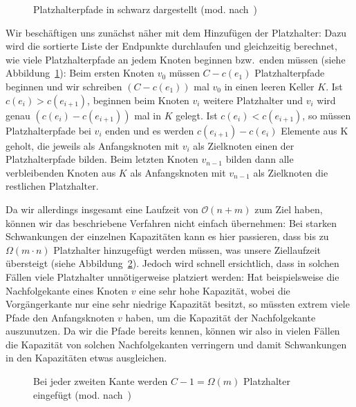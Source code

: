 \begin{figure}[htbp]
	\centering
	\def\svgwidth{250bp}
	
	\caption{Platzhalterpfade in schwarz dargestellt (mod. nach~\cite{paper})}
	\label{fig:dummy-paths}
\end{figure}

Wir beschäftigen uns zunächst näher mit dem Hinzufügen der Platzhalter:
Dazu wird die sortierte Liste der Endpunkte durchlaufen und gleichzeitig berechnet, wie viele Platzhalterpfade an jedem Knoten
beginnen bzw.\ enden müssen (siehe Abbildung~\ref{fig:dummy-paths}):
Beim ersten Knoten $v_0$ müssen $C - c(e_1)$ Platzhalterpfade beginnen und wir schreiben $(C - c(e_1))$ mal $v_0$ in einen
leeren Keller $K$.
Ist $c(e_i) > c(e_{i+1})$, beginnen beim Knoten $v_{i}$ weitere Platzhalter und $v_i$ wird genau $(c(e_i) - c(e_{i+1}))$ mal in $K$ gelegt.
Ist $c(e_i) < c(e_{i+1})$, so müssen Platzhalterpfade bei $v_i$ enden und es werden $c(e_{i+1}) - c(e_i)$ Elemente aus K geholt, die jeweils als Anfangsknoten mit $v_i$
als Zielknoten einen der Platzhalterpfade bilden.
Beim letzten Knoten $v_{n-1}$ bilden dann alle verbleibenden Knoten aus $K$ als Anfangsknoten mit $v_{n-1}$ als Zielknoten die restlichen Platzhalter.

Da wir allerdings insgesamt eine Laufzeit von $\mathcal O(n+m)$ zum Ziel haben, können wir das beschriebene Verfahren
nicht einfach übernehmen:
Bei starken Schwankungen der einzelnen Kapazitäten kann es hier passieren, dass bis zu $\Omega(m\cdot n)$
Platzhalter hinzugefügt werden müssen, was unsere Ziellaufzeit übersteigt (siehe Abbildung~\ref{fig:dummy-paths-too-many}).
Jedoch wird schnell ersichtlich, dass in solchen Fällen viele Platzhalter unnötigerweise platziert werden:
Hat beispielsweise die Nachfolgekante eines Knoten $v$ eine sehr hohe Kapazität, wobei die Vorgängerkante nur eine sehr
niedrige Kapazität besitzt, so müssten extrem viele Pfade den Anfangsknoten $v$ haben, um die Kapazität der
Nachfolgekante auszunutzen.
Da wir die Pfade bereits kennen, können wir also in vielen Fällen die Kapazität von solchen Nachfolgekanten verringern und
damit Schwankungen in den Kapazitäten etwas ausgleichen.

\begin{figure}[htbp]
	\centering
	\def\svgwidth{250bp}
	
	\caption{Bei jeder zweiten Kante werden $C-1=\Omega(m)$ Platzhalter eingefügt (mod. nach~\cite{paper})}
	\label{fig:dummy-paths-too-many}
\end{figure}


